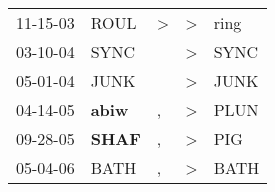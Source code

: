 \begin{supertabular}{p{0.07\textwidth}p{0.06\textwidth}p{0.02\textwidth}p{0.02\textwidth}p{0.06\textwidth}}
          11-15-03\textsuperscript{} &           ROUL\textsuperscript{} &  \textgreater &     \textgreater &           ring\textsuperscript{} \\
          03-10-04\textsuperscript{} &           SYNC\textsuperscript{} &               &     \textgreater &           SYNC\textsuperscript{} \\
          05-01-04\textsuperscript{} &           JUNK\textsuperscript{} &               &     \textgreater &           JUNK\textsuperscript{} \\
          04-14-05\textsuperscript{} &  \textbf{abiw\textsuperscript{}} &             , &     \textgreater &           PLUN\textsuperscript{} \\
          09-28-05\textsuperscript{} &  \textbf{SHAF\textsuperscript{}} &             , &     \textgreater &            PIG\textsuperscript{} \\
          05-04-06\textsuperscript{} &           BATH\textsuperscript{} &             , &     \textgreater &           BATH\textsuperscript{} \\
\end{supertabular}

